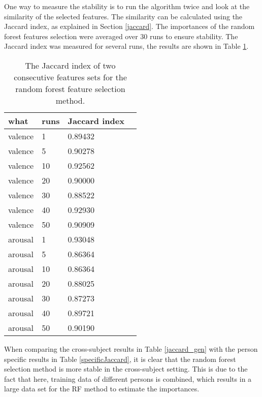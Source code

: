 \npar

One way to measure the stability is to run the algorithm twice and look at the similarity of the selected features. The similarity can be calculated using the Jaccard index, as explained in Section \ref{jaccard}. The importances of the random forest features selection were averaged over 30 runs to ensure stability. The Jaccard index was measured for several runs, the results are shown in Table \ref{Jaccard_gen}.

\begin{table}[H]
\centering
\caption{The Jaccard index of two consecutive features sets for the random forest feature selection method. \label{Jaccard_gen}}
\begin{tabular}{l|l|ll}
\textbf{what} & \textbf{runs} & \textbf{Jaccard index}    \\ \hline
valence       & 1             & 0.89432                   \\
valence       & 5             & 0.90278                   \\
valence       & 10            & 0.92562                   \\
valence       & 20            & 0.90000                   \\
valence       & 30            & 0.88522                   \\
valence       & 40            & 0.92930                   \\
valence       & 50            & 0.90909                   \\ \hline
arousal       & 1             & 0.93048                   \\
arousal       & 5             & 0.86364                   \\
arousal       & 10            & 0.86364                   \\
arousal       & 20            & 0.88025                   \\
arousal       & 30            & 0.87273                   \\
arousal       & 40            & 0.89721                   \\
arousal       & 50            & 0.90190                  
\end{tabular}
\end{table}

When comparing the cross-subject results in Table \ref{jaccard_gen} with the person specific results in Table \ref{specificJaccard}, it is clear that the random forest selection method is more stable in the cross-subject setting. This is due to the fact that here, training data of different persons is combined, which results in a large data set for the RF method to estimate the importances.